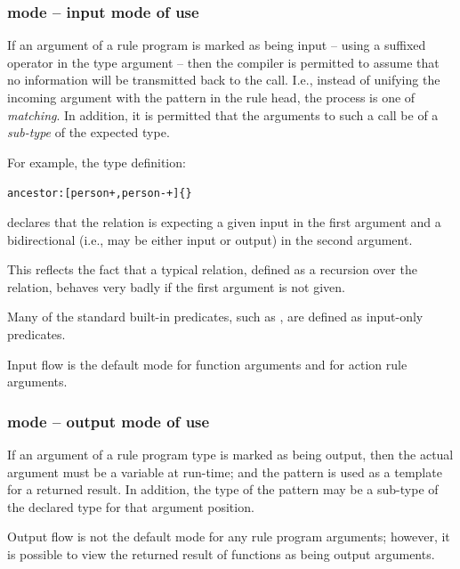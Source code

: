 \subsubsection{\q{+} mode -- input mode of use}

If an argument of a rule program is marked as being input -- using a suffixed \q{+} operator in the type argument -- then the compiler is permitted to assume that no information will be transmitted back to the call. I.e., instead of unifying the incoming argument with the pattern in the rule head, the process is one of \emph{matching}. In addition, it is permitted that the arguments to such a call be of a \emph{sub-type} of the expected type.

For example, the type definition:
\begin{alltt}
ancestor:[person+,person-+]\{\}
\end{alltt}
declares that the  relation is expecting a given input in the first argument and a bidirectional (i.e., may be either input or output) in the second argument.
\begin{aside}
This reflects the fact that a typical  relation, defined as a recursion over the  relation, behaves very badly if the first argument is not given.
\end{aside}

Many of the standard built-in predicates, such as , are defined as input-only predicates.

Input flow is the default mode for function arguments and for action rule arguments.

\subsubsection{\q{-} mode -- output mode of use}

If an argument of a rule program type is marked as being output, then the actual argument must be a variable at run-time; and the pattern is used as a template for a returned result. In addition, the type of the pattern may be a sub-type of the declared type for that argument position.

Output flow is not the default mode for any rule program arguments; however, it is possible to view the returned result of functions as being output arguments.

